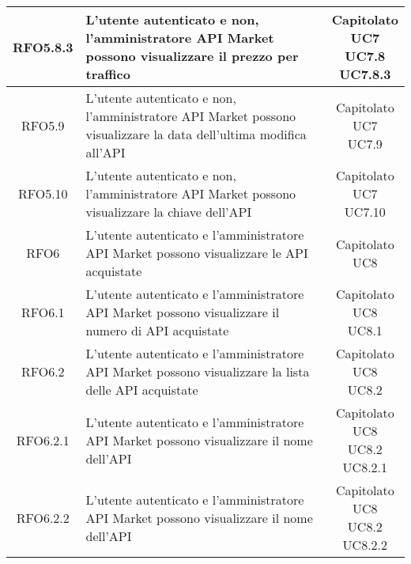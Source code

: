 \begin{longtable}{|c|p{8cm}|c|}
RFO5.8.3 &  L'utente autenticato e non, l'amministratore API Market possono visualizzare il prezzo per traffico & \makecell*{Capitolato\\UC7\\UC7.8\\UC7.8.3} \\
\hline

RFO5.9 & L'utente autenticato e non, l'amministratore API Market possono visualizzare la data dell'ultima modifica all'API& \makecell*{Capitolato\\UC7\\UC7.9} \\
\hline

RFO5.10 & L'utente autenticato e non, l'amministratore API Market possono visualizzare la chiave dell'API& \makecell*{Capitolato\\UC7\\UC7.10} \\
\hline

RFO6 & L'utente autenticato e l'amministratore API Market possono visualizzare le API acquistate & \makecell*{Capitolato\\UC8} \\
\hline

RFO6.1 & L'utente autenticato e l'amministratore API Market possono visualizzare il numero di API acquistate& \makecell*{Capitolato\\UC8\\UC8.1} \\
\hline

RFO6.2 & L'utente autenticato e l'amministratore API Market possono visualizzare la lista delle API acquistate& \makecell*{Capitolato\\UC8\\UC8.2} \\
\hline

RFO6.2.1 &  L'utente autenticato e l'amministratore API Market possono visualizzare il nome dell'API & \makecell*{Capitolato\\UC8\\UC8.2\\UC8.2.1} \\
\hline

RFO6.2.2 &  L'utente autenticato e l'amministratore API Market possono visualizzare il nome dell'API & \makecell*{Capitolato\\UC8\\UC8.2\\UC8.2.2} \\
\hline


\end{longtable}
